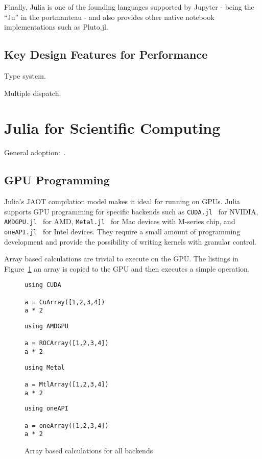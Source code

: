 \documentclass{webofc}
\begin{document}
Finally, Julia is one of the founding languages supported by Jupyter - being the
``Ju'' in the portmanteau - and also provides other native notebook
implementations such as Pluto.jl. 

\subsection{Key Design Features for Performance}

Type system.

Multiple dispatch.

\section{Julia for Scientific Computing}
\label{sec:juliascicomp}

General adoption:~\cite{perkel-julia-science}.
    
\subsection{GPU Programming}

Julia's JAOT compilation model makes it ideal for running on GPUs. Julia
supports GPU programming for specific backends such as
\texttt{CUDA.jl}~\cite{besard2018juliagpu} for NVIDIA,
\texttt{AMDGPU.jl}~\cite{julian_samaroo_2025_14826765} for AMD,
\texttt{Metal.jl}~\cite{Besard_Metal_jl_2022} for Mac devices with M-series
chip, and \texttt{oneAPI.jl}~\cite{Besard_oneAPI_jl_2022} for Intel devices.
They require a small amount of programming development and provide the
possibility of writing kernels with granular control.

Array based calculations are trivial to execute on the GPU. The listings in
Figure~\ref{code:arraysgpu} an array is copied to the GPU and then executes a
simple operation. 

\begin{figure}[!ht]
\centering
\begin{verbatim}
using CUDA

a = CuArray([1,2,3,4])
a * 2
\end{verbatim}
\begin{verbatim}
using AMDGPU

a = ROCArray([1,2,3,4])
a * 2
\end{verbatim}
\begin{verbatim}
using Metal

a = MtlArray([1,2,3,4])
a * 2
\end{verbatim}
\begin{verbatim}
using oneAPI

a = oneArray([1,2,3,4])
a * 2
\end{verbatim}
\caption{Array based calculations for all backends}
\label{code:arraysgpu}
\end{figure}
\end{document}
